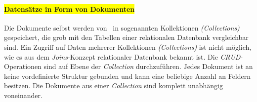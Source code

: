 \paragraph{\colorbox{yellow}{Datensätze in Form von Dokumenten}}

Die Dokumente selbst werden von \mongo\ in sogenannten Kollektionen \textit{(Collections)} gespeichert, die grob mit den Tabellen einer relationalen Datenbank vergleichbar sind. Ein Zugriff auf Daten mehrerer Kollektionen \textit{(Collections)} ist nicht möglich, wie es aus dem \textit{Joins}-Konzept relationaler Datenbank bekannt ist. Die \textit{CRUD}-Operationen sind auf Ebene der \textit{Collection} durchzuführen. Jedes Dokument ist an keine vordefinierte Struktur gebunden und kann eine beliebige Anzahl an Feldern besitzen. Die Dokumente aus einer \textit{Collection} sind komplett unabhängig voneinander. 

